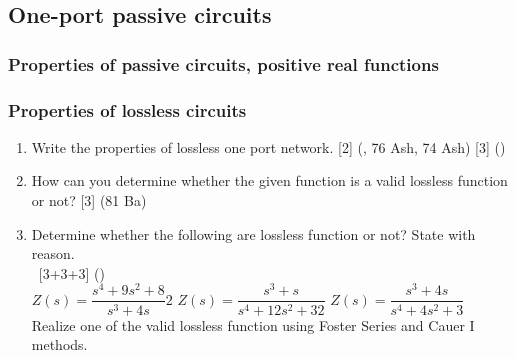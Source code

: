 \documentclass[12pt]{article}
\newcommand{\enter}{\\\textcolor{white}{1}}
\begin{document}
\subsection{One-port passive circuits}
\subsubsection{Properties of passive circuits, positive real functions}
\subsubsection{Properties of lossless circuits}
\begin{enumerate}[noitemsep, topsep=0pt]
	\item Write the properties of lossless one port network. \hfill [2] (, 76 Ash, 74 Ash) [3] ()
	
	\item How can you determine whether the given function is a valid lossless function or not? \hfill [3] (81 Ba)
	
	\item Determine whether the following are lossless function or not? State with reason. 
	\enter\hfill [3+3+3] ()\\
	$Z(s) = \dfrac{s^4+9s^2+8}{s^3+4s}2$ \hspace{1cm}
	$Z(s) = \dfrac{s^3+s}{s^4+12s^2+32}$ \hspace{1cm}
	$Z(s) = \dfrac{s^3+4s}{s^4+4s^2+3}$\\
	Realize one of the valid lossless function using Foster Series and Cauer I methods.
\end{enumerate}
\end{document}

